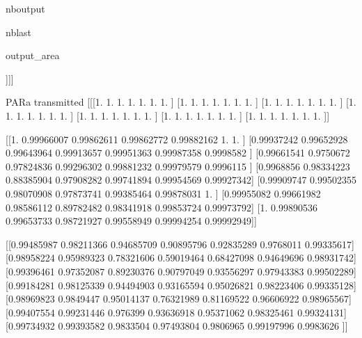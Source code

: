 \documentclass[letterpaper,10pt,english]{sphinxmanual}
\begin{document}
\begin{sphinxuseclass}{nboutput}
\begin{sphinxuseclass}{nblast}
{\begin{sphinxuseclass}{output_area}
\begin{sphinxuseclass}{}
\begin{sphinxVerbatim}[commandchars=\\\{\}]
  [[1.00000000e-14 1.00000000e-14 1.00000000e-14 1.00000000e-14
    1.00000000e-14 1.00000000e-14 1.00000000e-14]
   [1.00000000e-14 1.00000000e-14 1.67224873e-02 1.00000000e-14
    1.00000000e-14 1.00000000e-14 1.00000000e-14]
   [1.00000000e-14 1.00000000e-14 1.00000000e-14 1.00000000e-14
    1.00000000e-14 1.00000000e-14 1.00000000e-14]
   [1.00000000e-14 1.00000000e-14 1.00000000e-14 1.00000000e-14
    1.00000000e-14 1.00000000e-14 1.00000000e-14]
   [1.00000000e-14 1.00000000e-14 1.00000000e-14 1.00000000e-14
    1.00000000e-14 1.00000000e-14 1.00000000e-14]
   [1.00000000e-14 1.00000000e-14 1.00000000e-14 1.00000000e-14
    1.00000000e-14 1.00000000e-14 1.00000000e-14]
   [1.00000000e-14 1.00000000e-14 1.00000000e-14 1.00000000e-14
    1.00000000e-14 1.00000000e-14 1.00000000e-14]]]]


PARa transmitted
[[[1.         1.         1.         1.         1.         1.
   1.        ]
  [1.         1.         1.         1.         1.         1.
   1.        ]
  [1.         1.         1.         1.         1.         1.
   1.        ]
  [1.         1.         1.         1.         1.         1.
   1.        ]
  [1.         1.         1.         1.         1.         1.
   1.        ]
  [1.         1.         1.         1.         1.         1.
   1.        ]
  [1.         1.         1.         1.         1.         1.
   1.        ]]

 [[1.         0.99966007 0.99862611 0.99862772 0.99882162 1.
   1.        ]
  [0.99937242 0.99652928 0.99643964 0.99913657 0.99951363 0.99987358
   0.9998582 ]
  [0.99661541 0.9750672  0.97824836 0.99296302 0.99881232 0.99979579
   0.9996115 ]
  [0.9968856  0.98334223 0.88385904 0.97908282 0.99741894 0.99954569
   0.99927342]
  [0.99909747 0.99502355 0.98070908 0.97873741 0.99385464 0.99878031
   1.        ]
  [0.99955082 0.99661982 0.98586112 0.89782482 0.98341918 0.99853724
   0.99973792]
  [1.         0.99890536 0.99653733 0.98721927 0.99558949 0.99994254
   0.99992949]]

 [[0.99485987 0.98211366 0.94685709 0.90895796 0.92835289 0.9768011
   0.99335617]
  [0.98958224 0.95989323 0.78321606 0.59019464 0.68427098 0.94649696
   0.98931742]
  [0.99396461 0.97352087 0.89230376 0.90797049 0.93556297 0.97943383
   0.99502289]
  [0.99184281 0.98125339 0.94494903 0.93165594 0.95026821 0.98223406
   0.99335128]
  [0.98969823 0.9849447  0.95014137 0.76321989 0.81169522 0.96606922
   0.98965567]
  [0.99407554 0.99231446 0.976399   0.93636918 0.95371062 0.98325461
   0.99324131]
  [0.99734932 0.99393582 0.9833504  0.97493804 0.9806965  0.99197996
   0.9983626 ]]


\end{sphinxVerbatim}
\end{sphinxuseclass}
\end{sphinxuseclass}}
\end{sphinxuseclass}
\end{sphinxuseclass}
\end{document}
